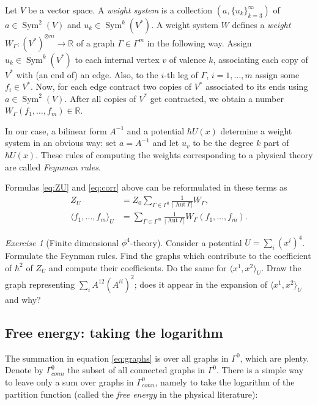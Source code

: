 \documentclass[10pt]{amsart}
\theoremstyle{definition}
\theoremstyle{remark}
\newtheorem{exs}[thm]{Exercise}
\newcommand{\R}{\mathbb R}
\def\<{\langle}
\def\>{\rangle}
\newcommand{\h}{\hbar}
\newcommand{\GG}{\Gamma}
\newcommand{\Aut}{\operatorname{Aut}}
\newcommand{\Sym}{\operatorname{Sym}}
\begin{document}
Let $V$ be a vector space. A {\em weight system} is a collection
$(a,\{u_k\}_{k=3}^\infty)$ of $a\in\Sym^2(V)$ and
$u_k\in\Sym^k(V^*)$. A weight system $W$ defines a {\em weight}
$W_\GG:(V^*)^{\otimes m}\to\R$ of a graph $\GG\in\GG^m$ in the
following way. Assign $u_k\in\Sym^k(V^*)$ to each internal vertex
$v$ of valence $k$, associating each copy of $V^*$ with (an end
of) an edge. Also, to the $i$-th leg of $\GG$, $i=1,\dots,m$
assign some $f_i\in V^*$. Now, for each edge contract two copies
of $V^*$ associated to its ends using $a\in\Sym^2(V)$. After all
copies of $V^*$ get contracted, we obtain a number
$W_\GG(f_1,\dots,f_m)\in\R$.

In our case, a bilinear form $A^{-1}$ and a potential $\h U(x)$
determine a weight system in an obvious way: set $a=A^{-1}$ and
let $u_v$ to be the degree $k$ part of $\h U(x)$.
These rules of computing the weights corresponding to a physical theory are
called {\em Feynman rules}.

Formulas \eqref{eq:ZU} and \eqref{eq:corr} above can be
reformulated in these terms as
\begin{equation}
\label{eq:graphs}
\begin{aligned}
             Z_U &=Z_0\sum_{\GG\in\GG^0}\frac1{|\Aut \GG|}W_\GG, \\
    \<f_1,\dots,f_m\>_U &=\sum_{\GG\in \GG^m} \frac1{|\Aut \GG|}
                      W_\GG(f_1,\dots,f_m).
\end{aligned}
\end{equation}

\begin{exs}[Finite dimensional $\phi^4$-theory]
Consider a potential $U=\sum_i (x^i)^4$. Formulate the Feynman
rules. Find the graphs which contribute to the coefficient of
$\h^2$ of $Z_U$ and compute their coefficients. Do the same for
$\<x^1,x^2\>_U$. Draw the graph representing $\sum_i
A^{12}(A^{ii})^2$; does it appear in the expansion of
$\<x^1,x^2\>_U$ and why?
\end{exs}

\subsection{Free energy: taking the logarithm}
The summation in equation \eqref{eq:graphs} is over all graphs in
$\GG^0$, which are plenty. Denote by $\GG^0_{conn}$ the subset of
all connected graphs in $\GG^0$. There is a simple way to leave
only a sum over graphs in $\GG^0_{conn}$, namely to take the
logarithm of the partition function (called the {\em free energy}
in the physical literature):
\end{document}
